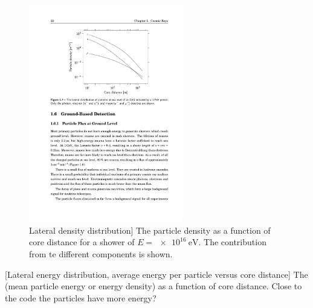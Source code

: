 \begin{figure}
    \centering
    \includegraphics[width=0.6\textwidth]
                    {plots/cosmic-rays/ldf}
    \caption{Lateral density distribution]
The particle density as a function of core distance for a shower of $E = \SI{e16}{\eV}$. The contribution from te different components is shown.}
    \label{fig:ldf}
\end{figure}

[Lateral energy distribution, average energy per particle versus core distance]
The (mean particle energy or energy density) as a function of core distance. Close to the code the particles have more energy?

